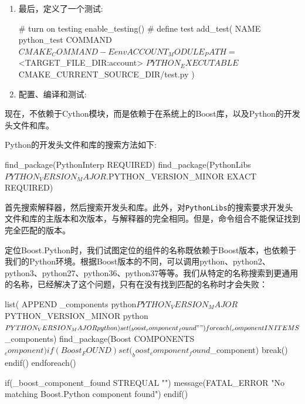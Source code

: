 \begin{enumerate}
\item 最后，定义了一个测试:

\begin{codebox}[cmake]
# turn on testing
enable_testing()
# define test
add_test(
  NAME
    python_test
  COMMAND
    ${CMAKE_COMMAND} -E env ACCOUNT_MODULE_PATH=$<TARGET_FILE_DIR:account>
    ${PYTHON_EXECUTABLE} ${CMAKE_CURRENT_SOURCE_DIR}/test.py
  )
\end{codebox}

\item 配置、编译和测试:


\end{enumerate}


现在，不依赖于Cython模块，而是依赖于在系统上的Boost库，以及Python的开发头文件和库。

Python的开发头文件和库的搜索方法如下:

\begin{codebox}[cmake]
find_package(PythonInterp REQUIRED)
find_package(PythonLibs ${PYTHON_VERSION_MAJOR}.${PYTHON_VERSION_MINOR} EXACT REQUIRED)
\end{codebox}

首先搜索解释器，然后搜索开发头和库。此外，对\texttt{PythonLibs}的搜索要求开发头文件和库的主版本和次版本，与解释器的完全相同。但是，命令组合不能保证找到完全匹配的版本。

定位Boost.Python时，我们试图定位的组件的名称既依赖于Boost版本，也依赖于我们的Python环境。根据Boost版本的不同，可以调用python、python2、python3、python27、python36、python37等等。我们从特定的名称搜索到更通用的名称，已经解决了这个问题，只有在没有找到匹配的名称时才会失败：

\begin{codebox}[cmake]
list(
  APPEND _components
    python${PYTHON_VERSION_MAJOR}${PYTHON_VERSION_MINOR}
    python${PYTHON_VERSION_MAJOR}
    python
  )
  
set(_boost_component_found "")

foreach(_component IN ITEMS ${_components})
    find_package(Boost COMPONENTS ${_component})
    if(Boost_FOUND)
        set(_boost_component_found ${_component})
        break()
    endif()
endforeach()

if(_boost_component_found STREQUAL "")
    message(FATAL_ERROR "No matching Boost.Python component found")
endif()
\end{codebox}

